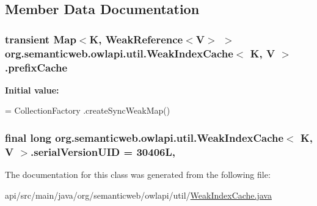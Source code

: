 \subsection{Member Data Documentation}
\hypertarget{classorg_1_1semanticweb_1_1owlapi_1_1util_1_1_weak_index_cache_3_01_k_00_01_v_01_4_aa5ebc26e5b50bd5921242af8dbe27974}{
\subsubsection[{prefix\-Cache}]{\setlength{\rightskip}{0pt plus 5cm}transient Map$<$K, Weak\-Reference$<$V$>$ $>$ org.\-semanticweb.\-owlapi.\-util.\-Weak\-Index\-Cache$<$ K, V $>$.prefix\-Cache\hspace{0.3cm}{\ttfamily [protected]}}}\label{classorg_1_1semanticweb_1_1owlapi_1_1util_1_1_weak_index_cache_3_01_k_00_01_v_01_4_aa5ebc26e5b50bd5921242af8dbe27974}
{\bfseries Initial value\-:}
\begin{DoxyCode}
= CollectionFactory
            .createSyncWeakMap()
\end{DoxyCode}
\hypertarget{classorg_1_1semanticweb_1_1owlapi_1_1util_1_1_weak_index_cache_3_01_k_00_01_v_01_4_ab9b1ea391b4e6975098d0253b1812c16}{
\subsubsection[{serial\-Version\-U\-I\-D}]{\setlength{\rightskip}{0pt plus 5cm}final long org.\-semanticweb.\-owlapi.\-util.\-Weak\-Index\-Cache$<$ K, V $>$.serial\-Version\-U\-I\-D = 30406\-L\hspace{0.3cm}{\ttfamily [static]}, {\ttfamily [private]}}}\label{classorg_1_1semanticweb_1_1owlapi_1_1util_1_1_weak_index_cache_3_01_k_00_01_v_01_4_ab9b1ea391b4e6975098d0253b1812c16}


The documentation for this class was generated from the following file\-:\begin{DoxyCompactItemize}
\item 
api/src/main/java/org/semanticweb/owlapi/util/\hyperlink{_weak_index_cache_8java}{Weak\-Index\-Cache.\-java}\end{DoxyCompactItemize}
